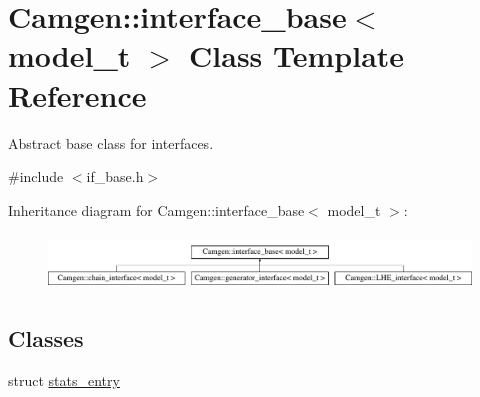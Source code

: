 \hypertarget{a00317}{}\section{Camgen\+:\+:interface\+\_\+base$<$ model\+\_\+t $>$ Class Template Reference}
\label{a00317}


Abstract base class for interfaces.  




{\ttfamily \#include $<$if\+\_\+base.\+h$>$}

Inheritance diagram for Camgen\+:\+:interface\+\_\+base$<$ model\+\_\+t $>$\+:\begin{figure}[H]
\begin{center}
\leavevmode
\includegraphics[height=1.487384cm]{a00317}
\end{center}
\end{figure}
\subsection*{Classes}
\begin{DoxyCompactItemize}
\item 
struct \hyperlink{a00523}{stats\+\_\+entry}
\end{DoxyCompactItemize}
